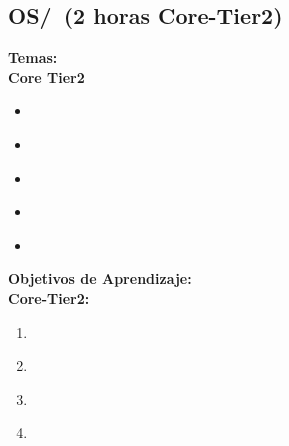 \subsection{OS/\OSSecurityandProtection~(2 horas Core-Tier2)}\label{sec:BOK:OSSecurityandProtection}
\noindent \textbf{Temas:}\\
\noindent \textbf{Core Tier2}
\begin{itemize}
	\item \OSSecurityandProtectionTopicOverview\label{sec:BOK:OSSecurityandProtectionTopicOverview}
	\item \OSSecurityandProtectionTopicPolicy\label{sec:BOK:OSSecurityandProtectionTopicPolicy}
	\item \OSSecurityandProtectionTopicSecurity\label{sec:BOK:OSSecurityandProtectionTopicSecurity}
	\item \OSSecurityandProtectionTopicProtection\label{sec:BOK:OSSecurityandProtectionTopicProtection}
	\item \OSSecurityandProtectionTopicBackups\label{sec:BOK:OSSecurityandProtectionTopicBackups}
\end{itemize}


\noindent \textbf{Objetivos de Aprendizaje:}\\
\noindent \textbf{Core-Tier2:}
\begin{enumerate}
	\setcounter{enumi}{0}
	\item \OSSecurityandProtectionLOArticulateTheProtection\xspace[\OSSecurityandProtectionLOArticulateTheProtectionLevel]\label{sec:BOK:OSSecurityandProtectionLOArticulateTheProtection}
	\item \OSSecurityandProtectionLOSummarizeTheLimitations\xspace[\OSSecurityandProtectionLOSummarizeTheLimitationsLevel]\label{sec:BOK:OSSecurityandProtectionLOSummarizeTheLimitations}
	\item \OSSecurityandProtectionLOExplainTheIn\xspace[\OSSecurityandProtectionLOExplainTheInLevel]\label{sec:BOK:OSSecurityandProtectionLOExplainTheIn}
	\item \OSSecurityandProtectionLOCarry\xspace[\OSSecurityandProtectionLOCarryLevel]\label{sec:BOK:OSSecurityandProtectionLOCarry}
\end{enumerate}


